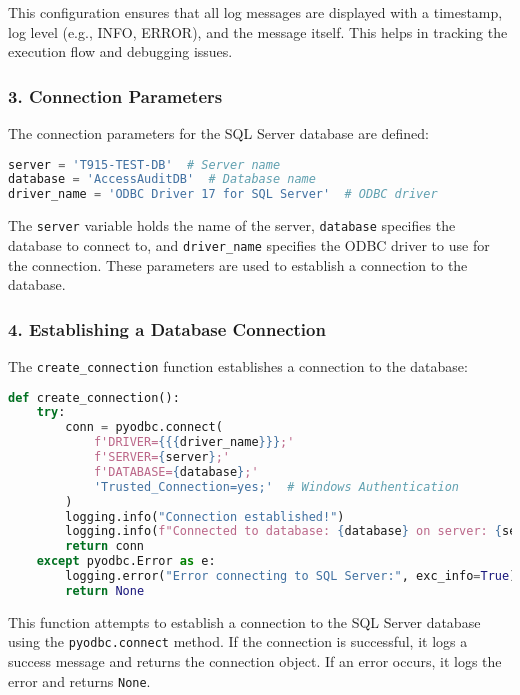 This configuration ensures that all log messages are displayed with a timestamp, log level (e.g., INFO, ERROR), and the message itself. This helps in tracking the execution flow and debugging issues.

\subsubsection*{3. Connection Parameters}
The connection parameters for the SQL Server database are defined:
\begin{lstlisting}[language=Python]
server = 'T915-TEST-DB'  # Server name
database = 'AccessAuditDB'  # Database name
driver_name = 'ODBC Driver 17 for SQL Server'  # ODBC driver
\end{lstlisting}\vspace{.4cm}

The \texttt{server} variable holds the name of the server, \texttt{database} specifies the database to connect to, and \texttt{driver\_name} specifies the ODBC driver to use for the connection. These parameters are used to establish a connection to the database.

\subsubsection*{4. Establishing a Database Connection}
The \texttt{create\_connection} function establishes a connection to the database:
\begin{lstlisting}[language=Python]
def create_connection():
    try:
        conn = pyodbc.connect(
            f'DRIVER={{{driver_name}}};'
            f'SERVER={server};'
            f'DATABASE={database};'
            'Trusted_Connection=yes;'  # Windows Authentication
        )
        logging.info("Connection established!")
        logging.info(f"Connected to database: {database} on server: {server}")
        return conn
    except pyodbc.Error as e:
        logging.error("Error connecting to SQL Server:", exc_info=True)
        return None
\end{lstlisting}\vspace{.4cm}

This function attempts to establish a connection to the SQL Server database using the \texttt{pyodbc.connect} method. If the connection is successful, it logs a success message and returns the connection object. If an error occurs, it logs the error and returns \texttt{None}.

